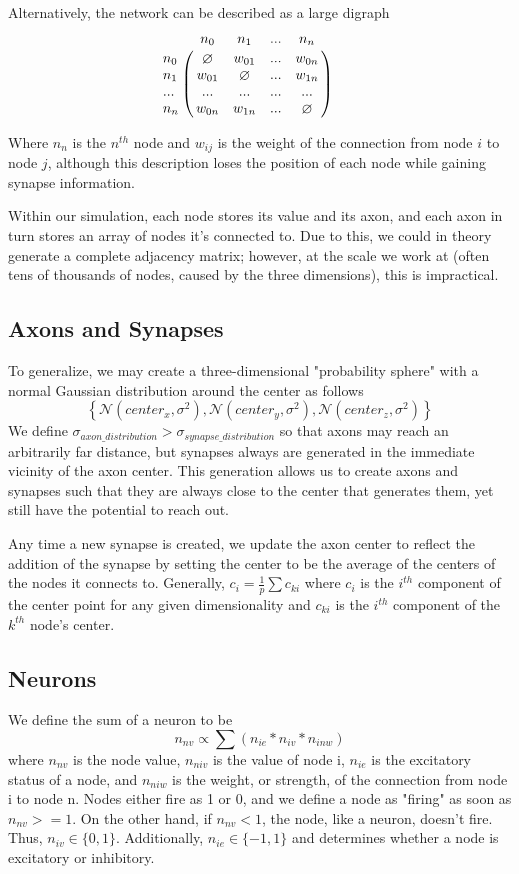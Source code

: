 \documentclass[12pt]{article}
\begin{document}
Alternatively, the network can be described as a large digraph
$$
\bordermatrix{
        & n_0 & n_1 & ... & n_n \cr
    n_0 & \o & w_{01} & ... & w_{0n} \cr
    n_1 & w_{01} & \o & ... & w_{1n} \cr
    ... & ... & ... & ... & ... \cr
    n_n & w_{0n} & w_{1n} & ... & \o } \qquad
$$

Where $n_n$ is the $n^{th}$ node and $w_{ij}$ is the weight of the connection from node $i$ to node $j$, although this description loses the position of each node while gaining synapse information.

Within our simulation, each node stores its value and its axon, and each axon in turn stores an array of nodes it's connected to.  Due to this, we could in theory generate a complete adjacency matrix; however, at the scale we work at (often tens of thousands of nodes, caused by the three dimensions), this is impractical.

\subsection{Axons and Synapses}

To generalize, we may create a three-dimensional "probability sphere" with a normal Gaussian distribution around the center as follows
$$\left\{\mathcal{N}(center_x, \sigma^{2}), \mathcal{N}(center_y, \sigma^{2}), \mathcal{N}(center_z, \sigma^{2})\right\}$$
We define $\sigma_{axon\_distribution} > \sigma_{synapse\_distribution}$ so that axons may reach an arbitrarily far distance, but synapses always are generated in the immediate vicinity of the axon center.  This generation allows us to create axons and synapses such that they are always close to the center that generates them, yet still have the potential to reach out.

Any time a new synapse is created, we update the axon center to reflect the addition of the synapse by setting the center to be the average of the centers of the nodes it connects to.  Generally, $c_i = \frac{1}{p}\sum c_{ki}$ where $c_i$ is the $i^{th}$ component of the center point for any given dimensionality and $c_{ki}$ is the $i^{th}$ component of the $k^{th}$ node's center.

\subsection{Neurons}

We define the sum of a neuron to be
$$n_{nv} \propto \sum (n_{ie} * n_{iv} * n_{inw})$$
where $n_{nv}$ is the node value, $n_{niv}$ is the value of node i, $n_{ie}$ is the excitatory status of a node, and $n_{niw}$ is the weight, or strength, of the connection from node i to node n.
Nodes either fire as 1 or 0, and we define a node as "firing" as soon as $n_{nv} >= 1$.  On the other hand, if $n_{nv} < 1$, the node, like a neuron, doesn't fire.  Thus, $n_{iv} \in \{0, 1\}$.  Additionally, $n_{ie} \in \{-1, 1\}$ and determines whether a node is excitatory or inhibitory.
\end{document}
